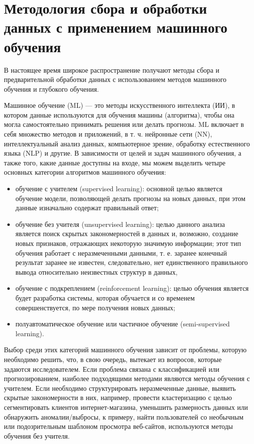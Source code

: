 \documentclass[12pt,a4paper, oneside]{extreport}
\begin{document}





\chapter{Методология сбора и обработки данных с применением машинного обучения}



В настоящее время широкое распространение получают методы сбора и предварительной обработки данных с использованием методов машинного обучения и глубокого обучения.

Машинное обучение (ML) — это методы искусственного интеллекта (ИИ), в котором данные используются для обучения машины (алгоритма), чтобы она могла самостоятельно принимать решения или делать прогнозы. 
ML включает  в себя множество методов и приложений, в т. ч. нейронные сети (NN),  интеллектуальный анализ данных, компьютерное зрение, обработку естественного языка (NLP) и другие. В зависимости от целей и задач машинного обучения, а также того, какие данные  доступны на входе, мы можем выделить четыре основных категории алгоритмов машинного обучения:


\begin{itemize}
	\item обучение с учителем (supervised learning): основной целью является обучение модели, позволяющей делать прогнозы на новых  данных, при этом данные   изначально содержат правильный ответ;
	\item обучение без учителя (unsupervised learning): целью  данного анализа является поиск скрытых закономерностей в  данных и, возможно, создание новых признаков, отражающих  некоторую значимую информации; этот тип обучения работает с неразмеченными  данными, т. е.  заранее конечный  результат заранее не известен, следовательно, нет единственного правильного вывода относительно неизвестных структур в данных,
	\item обучение с подкреплением (reinforcement learning): целью обучения является будет разработка системы, которая обучается и со временем совершенствуется, по мере получения  новых данных;
	\item  полуавтоматическое обучение или частичное обучение (semi-supervised learning).
\end{itemize}


Выбор среди этих категорий машинного обучения зависит от проблемы, которую необходимо решить, что, в свою очередь, вытекает из вопросов, которые задаются исследователем. 
Если проблема связана с классификацией или прогнозированием, наиболее подходящими методами являются методы обучения с учителем. Если необходимо структурировать   неразмеченные  данные, выявить скрытые закономерности в них, например,  провести кластеризацию  с целью сегментировать клиентов интернет-магазина, уменьшить размерность данных или обнаружить аномалии/выбросы, к примеру, найти пользователей со необычным  или подозрительным  шаблоном  просмотра веб-сайтов, используются методы обучения без учителя. 
\end{document}
